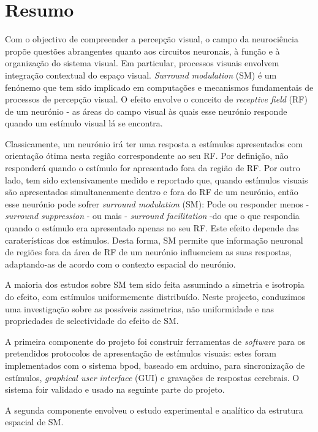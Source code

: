 \section*{Resumo}
Com o objectivo de compreender a percepção visual, o campo da neurociência propõe questões abrangentes quanto aos circuitos neuronais, à função e à organização do sistema visual. Em particular, processos visuais envolvem integração contextual do espaço visual. \textit{Surround modulation} (SM) é um fenónemo que tem sido implicado em computações e mecanismos fundamentais de processos de percepção visual. O efeito envolve o conceito de \textit{receptive field} (RF) de um neurónio - as áreas do campo visual às quais esse neurónio responde quando um estímulo visual lá se encontra. 

Classicamente, um neurónio irá ter uma resposta a estímulos apresentados com orientação ótima nesta região correspondente ao seu RF. Por definição, não responderá quando o estímulo for apresentado fora da região de RF. Por outro lado, tem sido extensivamente medido e reportado que, quando estímulos visuais são apresentados simultaneamente dentro e fora do RF de um neurónio, então esse neurónio pode sofrer \textit{surround modulation} (SM): Pode ou responder menos - \textit{surround suppression} - ou mais - \textit{surround facilitation} -do que o que respondia quando o estímulo era apresentado apenas no seu RF. Este efeito depende das caraterísticas dos estímulos. Desta forma, SM permite que informação neuronal de regiões fora da área de RF de um neurónio influenciem as suas respostas, adaptando-as de acordo com o contexto espacial do neurónio.

A maioria dos estudos sobre SM tem sido feita assumindo a simetria e isotropia do efeito, com estímulos uniformemente distribuído. Neste projecto, conduzimos uma investigação sobre as possíveis assimetrias, não uniformidade e nas propriedades de selectividade do efeito de SM.

A primeira componente do projeto foi construir ferramentas de \textit{software} para os pretendidos protocolos de apresentação de estímulos visuais: estes foram implementados com o sistema bpod, baseado em arduino, para sincronização de estímulos, \textit{graphical user interface} (GUI) e gravações de respostas cerebrais. O sistema foir validado e usado na seguinte parte do projeto.

A segunda componente envolveu o estudo experimental e analítico da estrutura espacial de SM.

